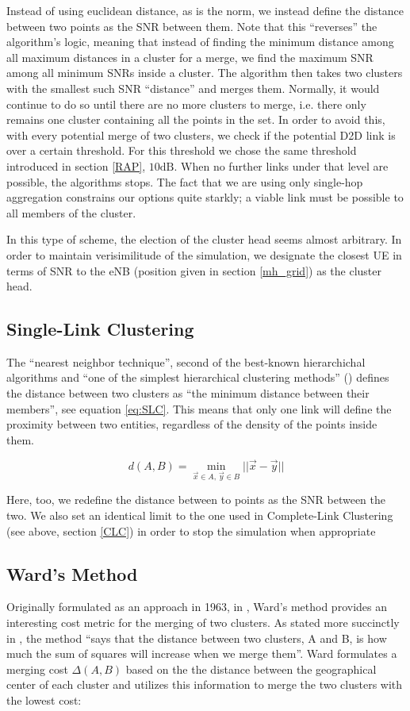 Instead of using euclidean distance, as is the norm, we instead define the distance between two points as the SNR between them. Note that this ``reverses'' the algorithm's logic, meaning that instead of finding the minimum distance among all maximum distances in a cluster for a merge, we find the maximum SNR among all minimum SNRs inside a cluster. The algorithm then takes two clusters with the smallest such SNR ``distance'' and merges them.  Normally, it would continue to do so until there are no more clusters to merge, i.e. there only remains one cluster containing all the points in the set. In order to avoid this, with every potential merge of two clusters, we check if the potential D2D link is over a certain threshold. For this threshold we chose the same threshold introduced in section \ref{RAP}, $10 \text{dB}$. When no further links under that level are possible, the algorithms stops. The fact that we are using only single-hop aggregation constrains our options quite starkly; a viable link must be possible to all members of the cluster.

In this type of scheme, the election of the cluster head seems almost arbitrary. In order to maintain verisimilitude of the simulation, we designate the closest UE in terms of SNR to the eNB (position given in section \ref{mh_grid}) as the cluster head.

\subsection{Single-Link Clustering}\label{SLC}
The ``nearest neighbor technique'', second of the best-known hierarchichal algorithms and ``one of the simplest hierarchical clustering methods'' (\cite{Everitt2011}) defines the distance between two clusters as ``the minimum distance between their members'', see equation \ref{eq:SLC}. This means that only one link will define the proximity between two entities, regardless of the density of the points inside them.

\begin{equation}\label{eq:SLC}
d(A,B) = \min_{\vec{x} \in A,\,\vec{y} \in B} ||\vec{x}  - \vec{y}||
\end{equation}

Here, too, we redefine the distance between to points as the SNR between the two. We also set an identical limit to the one used in Complete-Link Clustering (see above, section \ref{CLC}) in order to stop the simulation when appropriate

\subsection{Ward's Method}\label{WM}
Originally formulated as an approach in 1963, in \cite{Ward1963}, Ward's method provides an interesting cost metric for the merging of two clusters. As stated more succinctly in \cite{Shalizi2009}, the method ``says that the distance between two clusters, A and B, is how much the sum of squares will increase when we merge them''. Ward formulates a merging cost $\Delta(A,B)$ based on the the distance between the geographical center of each cluster and utilizes this information to merge the two clusters with the lowest cost:


